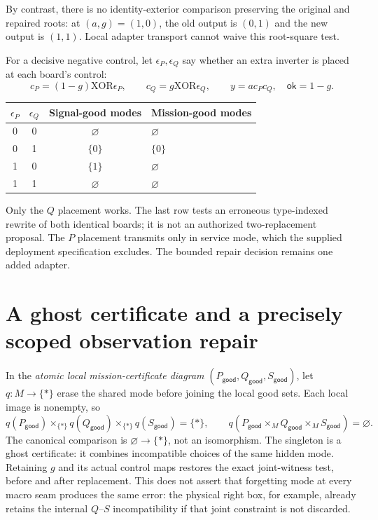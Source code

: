 \documentclass[11pt]{article}
\newcommand{\ok}{\mathsf{ok}}
\newcommand{\good}{\mathsf{good}}
\begin{document}
By contrast, there is no identity-exterior comparison preserving the original
and repaired roots: at $(a,g)=(1,0)$, the old output is $(0,1)$ and the new
output is $(1,1)$. Local adapter transport cannot waive this root-square test.

For a decisive negative control, let $\epsilon_P,\epsilon_Q$ say whether an
extra inverter is placed at each board's control:
\[
 c_P=(1-g)\mathbin{\mathrm{XOR}}\epsilon_P,
 \qquad c_Q=g\mathbin{\mathrm{XOR}}\epsilon_Q,
 \qquad y=ac_Pc_Q,\quad\ok=1-g.
\]
\begin{center}
\begin{tabular}{cccl}
\toprule
$\epsilon_P$&$\epsilon_Q$&Signal-good modes&Mission-good modes\\
\midrule
0&0&$\varnothing$&$\varnothing$\\
0&1&$\{0\}$&$\{0\}$\\
1&0&$\{1\}$&$\varnothing$\\
1&1&$\varnothing$&$\varnothing$\\
\bottomrule
\end{tabular}
\end{center}
Only the $Q$ placement works. The last row tests an erroneous type-indexed
rewrite of both identical boards; it is not an authorized two-replacement
proposal. The $P$ placement transmits only in service mode, which the supplied
deployment specification excludes. The bounded repair decision remains one
added adapter.

\section{A ghost certificate and a precisely scoped observation repair}

In the \emph{atomic local mission-certificate diagram}
$(P_{\good},Q_{\good},S_{\good})$, let $q:M\to\{*\}$ erase the shared mode before
joining the local good sets.
Each local image is nonempty, so
\[
 q(P_{\good})\times_{\{*\}}q(Q_{\good})
          \times_{\{*\}}q(S_{\good})=\{*\},
 \qquad
 q(P_{\good}\times_M Q_{\good}\times_M S_{\good})=\varnothing.
\]
The canonical comparison is $\varnothing\to\{*\}$, not an isomorphism.
The singleton is a ghost certificate: it combines incompatible choices of the
same hidden mode. Retaining $g$ and its actual control maps restores the exact
joint-witness test, before and after replacement.
This does not assert that forgetting mode at every macro seam produces the
same error: the physical right box, for example, already retains the internal
$Q$--$S$ incompatibility if that joint constraint is not discarded.
\end{document}
